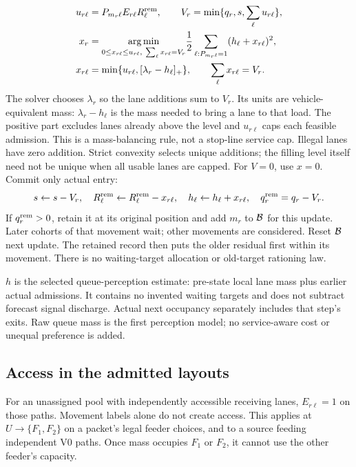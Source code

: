 \documentclass[10pt,a4paper]{article}
\newcommand{\pos}[1]{[#1]_+}
\begin{document}
\begin{align}
 u_{r\ell}&=P_{m_r\ell}E_{r\ell}R^{\rm rem}_\ell,\qquad
 V_r=\min\{q_r,s,\sum_\ell u_{r\ell}\},\nonumber\\
 x_r&=\underset{0\leq x_{r\ell}\leq u_{r\ell},\
                    \sum_\ell x_{r\ell}=V_r}{\arg\min}
          \frac12\sum_{\ell:P_{m_r\ell}=1}(h_\ell+x_{r\ell})^2,
 \nonumber\\
 x_{r\ell}&=\min\{u_{r\ell},\pos{\lambda_r-h_\ell}\},\qquad
                    \sum_\ell x_{r\ell}=V_r .
 \label{eq:allocation}
\end{align}
The solver chooses $\lambda_r$ so the lane additions sum to $V_r$.
Its units are vehicle-equivalent mass: $\lambda_r-h_\ell$ is the mass
needed to bring a lane to that load. The positive part excludes lanes
already above the level and $u_{r\ell}$ caps each feasible admission.
This is a mass-balancing rule, not a stop-line service cap. Illegal lanes
have zero addition. Strict convexity selects unique additions; the filling
level itself need not be unique when all usable lanes are capped.
For $V=0$, use $x=0$. Commit only actual entry:
\begin{equation}
 s\leftarrow s-V_r,\quad
 R^{\rm rem}_\ell\leftarrow R^{\rm rem}_\ell-x_{r\ell},\quad
 h_\ell\leftarrow h_\ell+x_{r\ell},\quad
 q_r^{\rm rem}=q_r-V_r .
 \label{eq:allocation-update}
\end{equation}
If $q_r^{\rm rem}>0$, retain it at its original position and add $m_r$
to ${\cal B}$ for this update. Later cohorts of that movement wait;
other movements are considered. Reset ${\cal B}$ next update.
The retained record then puts the older residual first within its
movement. There is no waiting-target allocation or old-target rationing law.

$h$ is the selected queue-perception estimate: pre-state local lane mass
plus earlier actual admissions. It contains no invented waiting targets
and does not subtract forecast signal discharge. Actual next occupancy
separately includes that step's exits. Raw queue mass is the first
perception model; no service-aware cost or unequal preference is added.

\subsection*{Access in the admitted layouts}

For an unassigned pool with independently accessible receiving lanes,
$E_{r\ell}=1$ on those paths. Movement labels alone do not create access.
This applies at $U\to\{F_1,F_2\}$ on a packet's legal feeder choices,
and to a source feeding independent V0 paths. Once mass occupies $F_1$
or $F_2$, it cannot use the other feeder's capacity.
\end{document}

